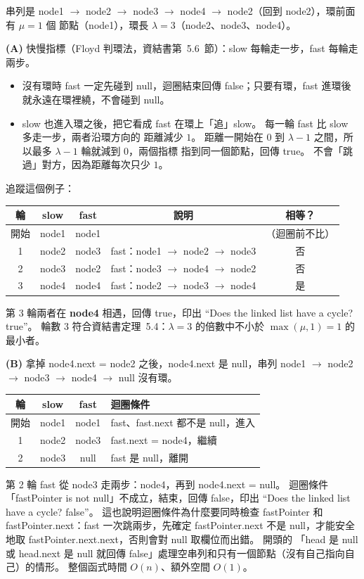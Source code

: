 \begin{pastsoln}
串列是 node1 $\to$ node2 $\to$ node3 $\to$ node4 $\to$ node2（回到 node2），環前面有 $\mu = 1$ 個
節點（node1），環長 $\lambda = 3$（node2、node3、node4）。

\textbf{(A)} 快慢指標（Floyd 判環法，資結書第~5.6~節）：slow 每輪走一步，fast 每輪走兩步。
\begin{itemize}
\item 沒有環時 fast 一定先碰到 null，迴圈結束回傳 false；只要有環，fast 進環後就永遠在環裡繞，不會碰到
null。
\item slow 也進入環之後，把它看成 fast 在環上「追」slow。 每一輪 fast 比 slow 多走一步，兩者沿環方向的
距離減少 $1$。 距離一開始在 $0$ 到 $\lambda - 1$ 之間，所以最多 $\lambda - 1$ 輪就減到 $0$，兩個指標
指到同一個節點，回傳 true。 不會「跳過」對方，因為距離每次只少 $1$。
\end{itemize}
追蹤這個例子：
\begin{center}
\small
\begin{tabular}{ccccc}
\toprule
輪 & slow & fast & 說明 & 相等？ \\
\midrule
開始 & node1 & node1 & & （迴圈前不比） \\
1 & node2 & node3 & fast：node1 $\to$ node2 $\to$ node3 & 否 \\
2 & node3 & node2 & fast：node3 $\to$ node4 $\to$ node2 & 否 \\
3 & node4 & node4 & fast：node2 $\to$ node3 $\to$ node4 & 是 \\
\bottomrule
\end{tabular}
\end{center}
第 3 輪兩者在 \textbf{node4} 相遇，回傳 true，印出
``Does the linked list have a cycle? true''。 輪數 $3$ 符合資結書定理~5.4：$\lambda = 3$ 的倍數中不小於
$\max(\mu, 1) = 1$ 的最小者。

\textbf{(B)} 拿掉 node4.next = node2 之後，node4.next 是 null，串列 node1 $\to$ node2 $\to$ node3
$\to$ node4 $\to$ null 沒有環。
\begin{center}
\small
\begin{tabular}{cccl}
\toprule
輪 & slow & fast & 迴圈條件 \\
\midrule
開始 & node1 & node1 & fast、fast.next 都不是 null，進入 \\
1 & node2 & node3 & fast.next = node4，繼續 \\
2 & node3 & null & fast 是 null，離開 \\
\bottomrule
\end{tabular}
\end{center}
第 2 輪 fast 從 node3 走兩步：node4，再到 node4.next = null。 迴圈條件
「fastPointer is not null」不成立，結束，回傳 false，印出 ``Does the linked list have a cycle? false''。
這也說明迴圈條件為什麼要同時檢查 fastPointer 和 fastPointer.next：fast 一次跳兩步，先確定
fastPointer.next 不是 null，才能安全地取 fastPointer.next.next，否則會對 null 取欄位而出錯。 開頭的
「head 是 null 或 head.next 是 null 就回傳 false」處理空串列和只有一個節點（沒有自己指向自己）的情形。
整個函式時間 $O(n)$、額外空間 $O(1)$。
\end{pastsoln}
